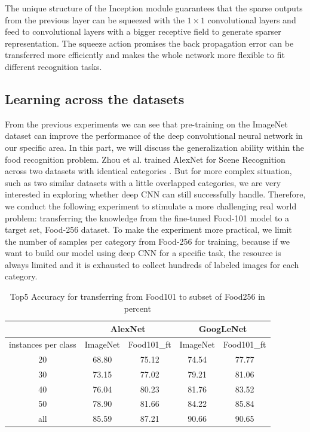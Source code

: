 The unique structure of the Inception module guarantees that the sparse outputs from the previous layer can be squeezed with the $1\times 1$ convolutional layers and feed to convolutional layers with a bigger receptive field to generate sparser representation. The squeeze action promises the back propagation error can be transferred more efficiently and makes the whole network more flexible to fit different recognition tasks.

\subsection{Learning across the datasets}
From the previous experiments we can see that pre-training on the ImageNet dataset can improve the performance of the deep convolutional neural network in our specific area. In this part, we will discuss the generalization ability within the food recognition problem.  Zhou et al. trained AlexNet for Scene Recognition across two datasets with identical categories \cite{NIPS2014_Zhou}. But for more complex situation, such as two similar datasets with a little overlapped categories, we are very interested in exploring whether deep CNN can still successfully handle. Therefore, we conduct the following experiment to stimulate a more challenging real world problem: transferring the knowledge from the fine-tuned Food-101 model to a target set, Food-256 dataset. To make the experiment more practical, we limit the number of samples per category from Food-256 for training, because if we want to build our model using deep CNN for a specific task, the resource is always limited and it is exhausted to collect hundreds of labeled images for each category.

\begin{table}[htbp]
	\centering
	\begin{tabular}{|c|cc|cc|}
		\hline
		& \multicolumn{2}{c|}{AlexNet} & \multicolumn{2}{c|}{GoogLeNet} \\
		\hline
		instances per class & ImageNet  & Food101\_ft    &  ImageNet  & Food101\_ft \\ \hline
		20    & 68.80  & {75.12} & 74.54 & {77.77} \\
		30    & 73.15 & {77.02} & 79.21 & {81.06} \\
		40    & 76.04 & {80.23} & 81.76 & {83.52} \\
		50    & 78.90  & {81.66} & 84.22 & {85.84} \\
		all    & 85.59 &  {87.21} & {90.66 }&   {90.65}     \\
		\hline
	\end{tabular}%
	\caption{Top5 Accuracy for transferring from Food101 to subset of Food256 in percent}
	\label{tab:cross}%
\end{table}%

